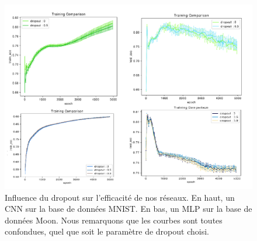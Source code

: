 \begin{figure}[!ht]
\centering
\includegraphics[width=340pt]{images/cnn/resultat_dropout.png}
\caption{Influence du dropout sur l'efficacité de nos réseaux. En haut, un CNN sur la base de données MNIST. En bas, un MLP sur la base de données Moon. Nous remarquons que les courbes sont toutes confondues, quel que soit le paramètre de dropout choisi.}
\label{resultat_dropout}
\end{figure}

 


